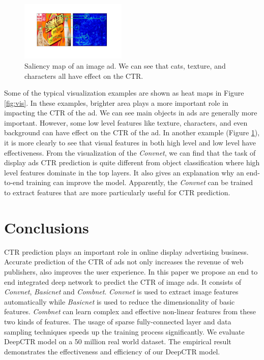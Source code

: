 \documentclass{sig-alternate}
\begin{document}
\begin{figure}
	\centering
	\includegraphics[width=0.45\textwidth]{vis_compare}
	\caption{Saliency map of an image ad. We can see that cats, texture, and characters all have effect on the CTR. }
	\label{fig:vis_compare}
\end{figure}
Some of the typical visualization examples are shown as heat maps  in Figure \ref{fig:vis}. In  these examples, brighter area plays a more important role in impacting the CTR of the ad. We can see main objects in ads are generally more important. However,  some low level features like texture, characters, and even background can have effect on the CTR of the ad. In another example (Figure \ref{fig:vis_compare}), it is more clearly to see that visual features in both high level and low level have effectiveness. From the visualization of the \emph{Convnet}, we can find that  the task of display ads CTR prediction is quite different from object classification where high level features dominate in the top layers.  It  also   gives an explanation why an end-to-end training can improve the model. Apparently, the \emph{Convnet} can be trained to extract features that are more particularly useful for CTR prediction.
\section{Conclusions}
CTR prediction plays an important role in online display advertising business. Accurate prediction of the CTR of ads not only increases the revenue of web publishers, also improves the user experience. In this paper we propose an end to end integrated deep network to predict the CTR of image ads.  It consists of \emph{Convnet}, \emph{Basicnet} and \emph{Combnet}. \emph{Convnet} is used to extract image features automatically while \emph{Basicnet} is used to reduce the dimensionality of basic features. \emph{Combnet} can learn complex and effective non-linear features from these two kinds of  features. The usage of sparse fully-connected layer and data sampling techniques speeds up the training process significantly.
We evaluate DeepCTR model on a 50 million real world dataset. The empirical result demonstrates 
the effectiveness and efficiency of our DeepCTR model. 



%

%
\end{document}
